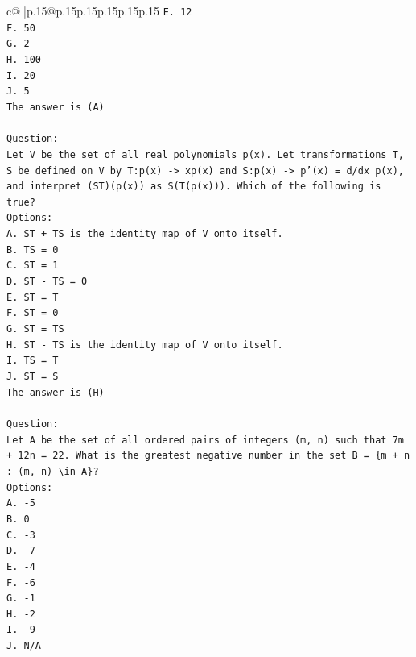 \documentclass{article}
\begin{document}
{\begin{supertabular}{c@{$\;$}|p{.15\linewidth}@{}p{.15\linewidth}p{.15\linewidth}p{.15\linewidth}p{.15\linewidth}p{.15\linewidth}}
{{{\texttt{E. 12} \\
\texttt{F. 50} \\
\texttt{G. 2} \\
\texttt{H. 100} \\
\texttt{I. 20} \\
\texttt{J. 5} \\
\texttt{The answer is (A)} \\
\\ 
\texttt{Question:} \\
\texttt{Let V be the set of all real polynomials p(x). Let transformations T, S be defined on V by T:p(x) {-}> xp(x) and S:p(x) {-}> p'(x) = d/dx p(x), and interpret (ST)(p(x)) as S(T(p(x))). Which of the following is true?} \\
\texttt{Options:} \\
\texttt{A. ST + TS is the identity map of V onto itself.} \\
\texttt{B. TS = 0} \\
\texttt{C. ST = 1} \\
\texttt{D. ST {-} TS = 0} \\
\texttt{E. ST = T} \\
\texttt{F. ST = 0} \\
\texttt{G. ST = TS} \\
\texttt{H. ST {-} TS is the identity map of V onto itself.} \\
\texttt{I. TS = T} \\
\texttt{J. ST = S} \\
\texttt{The answer is (H)} \\
\\ 
\texttt{Question:} \\
\texttt{Let A be the set of all ordered pairs of integers (m, n) such that 7m + 12n = 22. What is the greatest negative number in the set B = \{m + n : (m, n) \textbackslash{}in A\}?} \\
\texttt{Options:} \\
\texttt{A. {-}5} \\
\texttt{B. 0} \\
\texttt{C. {-}3} \\
\texttt{D. {-}7} \\
\texttt{E. {-}4} \\
\texttt{F. {-}6} \\
\texttt{G. {-}1} \\
\texttt{H. {-}2} \\
\texttt{I. {-}9} \\
\texttt{J. N/A} \\
}}}
\end{supertabular}}
\end{document}

